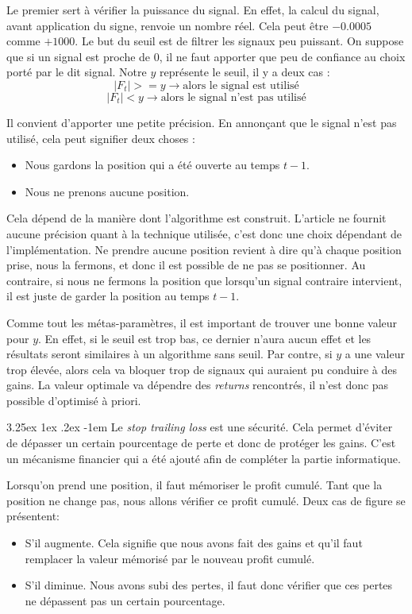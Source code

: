 \documentclass[a4paper, 11pt]{article}
\makeatletter
\renewcommand\paragraph{\@startsection{paragraph}{5}{\z@}%
  {3.25ex \@plus1ex \@minus.2ex}%
  {-1em}%
  {\normalfont\normalsize\bfseries}}
\makeatother
\begin{document}
Le premier sert à vérifier la puissance du signal. En effet, la calcul du signal, avant application du signe, renvoie un nombre réel. Cela peut être
$-0.0005$ comme $+1000$. Le but du seuil est de filtrer les signaux peu puissant. On suppose que si un signal est proche de 0, il ne faut apporter que
peu de confiance au choix porté par le dit signal. Notre $y$ représente le seuil, il y a deux cas :
$$|F_t | >= y \rightarrow \text{alors le signal est utilisé}$$
$$|F_t | < y \rightarrow \text{alors le signal n'est pas utilisé}$$

Il convient d'apporter une petite précision. En annonçant que le signal n'est pas utilisé, cela peut signifier deux choses :
\begin{itemize}
 \item Nous gardons la position qui a été ouverte au temps $t-1$.
 \item Nous ne prenons aucune position.
\end{itemize}

Cela dépend de la manière dont l'algorithme est construit. L'article ne fournit aucune précision quant à la technique utilisée, c'est donc une choix
dépendant de l'implémentation. Ne prendre aucune position revient à dire qu'à chaque position prise, nous la fermons, et donc il est possible de ne pas
se positionner. Au contraire, si nous ne fermons la position que lorsqu'un signal contraire intervient, il est juste de garder la position au temps $t-1$.

Comme tout les métas-paramètres, il est important de trouver une bonne valeur pour $y$. En effet, si le seuil est trop bas, ce dernier n'aura aucun effet 
et les résultats seront similaires à un algorithme sans seuil. Par contre, si $y$ a une valeur trop élevée, alors cela va bloquer trop de signaux qui
auraient pu conduire à des gains. La valeur optimale va dépendre des \textit{returns} rencontrés, il n'est donc pas possible d'optimisé à priori.

\paragraph{}
Le \textit{stop trailing loss} est une sécurité. Cela permet d'éviter de dépasser un certain pourcentage de perte et donc de protéger les gains. C'est un
mécanisme financier qui a été ajouté afin de compléter la partie informatique.

Lorsqu'on prend une position, il faut mémoriser le profit cumulé. Tant que la position ne change pas, nous allons vérifier ce profit cumulé. Deux cas de
figure se présentent:
\begin{itemize}
 \item S'il augmente. Cela signifie que nous avons fait des gains et qu'il faut remplacer la valeur mémorisé par le nouveau profit cumulé.
 \item S'il diminue. Nous avons subi des pertes, il faut donc vérifier que ces pertes ne dépassent pas un certain pourcentage.
\end{itemize}
\end{document}
